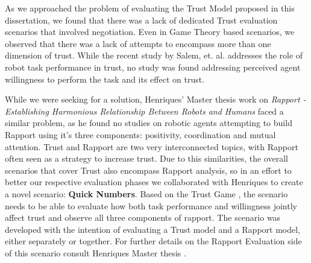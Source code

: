 \label{chap:Scenario}

As we approached the problem of evaluating the Trust Model proposed in this dissertation, we found that there was a lack of dedicated Trust evaluation scenarios that involved negotiation. Even in Game Theory based scenarios, we observed that there was a lack of attempts to encompass more than one dimension of trust. While the recent study by Salem, et. al. \cite{Salem2015b} addresses the role of robot task performance in trust, no study was found addressing perceived agent willingness to perform the task and its effect on trust. 

While we were seeking for a solution, Henriques' Master thesis work on \textit{Rapport - Establishing Harmonious Relationship Between Robots and Humans} \cite{Henriques2016} faced a similar problem, as he found no studies on robotic agents attempting to build Rapport using it's three components: positivity, coordination and mutual attention. Trust and Rapport are two very interconnected topics, with Rapport often seen as a strategy to increase trust. Due to this similarities, the overall scenarios that cover Trust also encompass Rapport analysis, so in an effort to better our respective evaluation phases we collaborated with Henriques to create a novel scenario: \textbf{Quick Numbers}. Based on the Trust Game \cite{JoyceBergJohnDickhaut}, the scenario needs to be able to evaluate how both task performance and willingness jointly affect trust and observe all three components of rapport. The scenario was developed with the intention of evaluating a Trust model and a Rapport model, either separately or together. For further details on the Rapport Evaluation side of this scenario consult Henriques Master thesis \cite{Henriques2016}.

